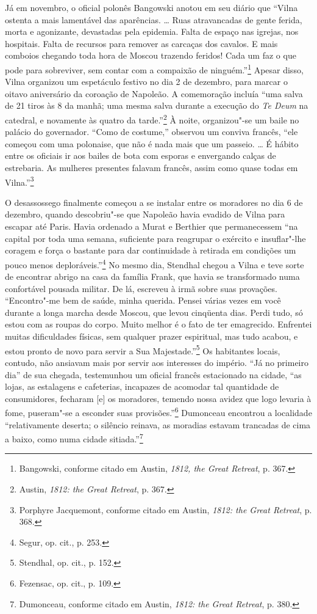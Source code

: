 Já em novembro, o oficial polonês Bangowski anotou em seu diário que
``Vilna ostenta a mais lamentável das aparências. \ldots{} Ruas
atravancadas de gente ferida, morta e agonizante, devastadas pela
epidemia. Falta de espaço nas igrejas, nos hospitais. Falta de recursos
para remover as carcaças dos cavalos. E mais comboios chegando toda hora
de Moscou trazendo feridos! Cada um faz o que pode para sobreviver, sem
contar com a compaixão de ninguém.''\footnote{Bangowski, conforme citado
  em Austin, \emph{1812, the Great Retreat}, p. 367.} Apesar disso,
Vilna organizou um espetáculo festivo no dia 2 de dezembro, para marcar
o oitavo aniversário da coroação de Napoleão. A comemoração incluía
``uma salva de 21 tiros às 8 da manhã; uma mesma salva durante a
execução do \emph{Te Deum} na catedral, e novamente às quatro da
tarde.''\footnote{Austin, \emph{1812: the Great Retreat}, p. 367.} À
noite, organizou"-se um baile no palácio do governador. ``Como de
costume,'' observou um conviva francês, ``ele começou com uma polonaise,
que não é nada mais que um passeio. \ldots{} É hábito entre os oficiais
ir aos bailes de bota com esporas e envergando calças de estrebaria. As
mulheres presentes falavam francês, assim como quase todas em
Vilna.''\footnote{Porphyre Jacquemont, conforme citado em Austin,
  \emph{1812: the Great Retreat}, p. 368.}

O desassossego finalmente começou a se instalar entre os moradores no
dia 6 de dezembro, quando descobriu"-se que Napoleão havia evadido de
Vilna para escapar até Paris. Havia ordenado a Murat e Berthier que
permanecessem ``na capital por toda uma semana, suficiente para
reagrupar o exército e insuflar"-lhe coragem e força o bastante para dar
continuidade à retirada em condições um pouco menos
deploráveis.''\footnote{Segur, op. cit., p. 253.} No mesmo dia, Stendhal
chegou a Vilna e teve sorte de encontrar abrigo na casa da família
Frank, que havia se transformado numa confortável pousada militar. De
lá, escreveu à irmã sobre suas provações. ``Encontro"-me bem de saúde,
minha querida. Pensei várias vezes em você durante a longa marcha desde
Moscou, que levou cinqüenta dias. Perdi tudo, só estou com as roupas do
corpo. Muito melhor é o fato de ter emagrecido. Enfrentei muitas
dificuldades físicas, sem qualquer prazer espiritual, mas tudo acabou, e
estou pronto de novo para servir a Sua Majestade.''\footnote{Stendhal,
  op. cit., p. 152.} Os habitantes locais, contudo, não ansiavam mais
por servir aos interesses do império. ``Já no primeiro dia'' de sua
chegada, testemunhou um oficial francês estacionado na cidade, ``as
lojas, as estalagens e cafeterias, incapazes de acomodar tal quantidade
de consumidores, fecharam {[}e{]} os moradores, temendo nossa avidez que
logo levaria à fome, puseram"-se a esconder suas provisões.''\footnote{Fezensac,
  op. cit., p. 109.} Dumonceau encontrou a localidade ``relativamente
deserta; o silêncio reinava, as moradias estavam trancadas de cima a
baixo, como numa cidade sitiada.''\footnote{Dumonceau, conforme citado
  em Austin, \emph{1812: the Great Retreat}, p. 380.}

